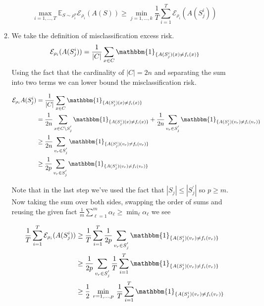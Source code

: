 \documentclass{article}
\newcommand{\one}{\mathbbm{1}}
\newcommand{\ones}[2]{\one_{\{#1\ne#2\}}}
\newcommand{\prob}[2]{\rho_#1^#2}
\newcommand{\expectation}{\mathbb{E}_{S\sim\prob{i}{n}}}
\begin{document}
\begin{enumerate}
\begin{enumerate}[label=\alph*.]
    \begin{equation}
        \max_{i=1,\dots,T} \expectation\mathcal{E}_{\rho_i}(A(S)) \ge \min_{j=1,\dots,k}\frac{1}{T}\sum\limits_{i=1}^{T}\mathcal{E}_{\rho_i}(A(S_j^i))
        \label{eqn:b}
    \end{equation}
    \item We take the definition of misclassification excess risk.
    \begin{equation*}
        \mathcal{E}_{\rho_i}(A(S_j^i)) = \frac{1}{|C|}\sum\limits_{x\in C}\ones{A(S_j^i)(x)}{f_i(x)}
    \end{equation*}
    Using the fact that the cardinality of $|C| = 2n$ and separating the sum into two terms we can lower bound the misclassification risk.

    \begin{align*}
        \mathcal{E}_{\rho_i}A(S_j^i) &= \frac{1}{|C|}\sum\limits_{x\in C}\ones{A(S_j^i)(x)}{f_i(x)}\\
        &=\frac{1}{2n} \sum\limits_{x\in C\setminus{S_{j}^{'}}}\ones{A(S_j^i)(x)}{f_i(x)} + \frac{1}{2n}\sum\limits_{v_r\in S_j^{'}}\ones{A(S_j^i)(v_r)}{f_i(v_r)}\\
        &\ge\frac{1}{2n}\sum\limits_{v_r\in S_j^{'}}\ones{A(S_j^i)(v_r)}{f_i(v_r)}\\
        &\ge\frac{1}{2p}\sum\limits_{v_r\in S_j^{'}}\ones{A(S_j^i)(v_r)}{f_i(v_r)}
    \end{align*}

    Note that in the last step we've used the fact that $|S_j|\le|S_j^'|$ so $p\ge m$. Now taking the sum over both sides, swapping the order of sums and reusing the given fact $\frac{1}{m} \sum_{\ell=1}^m\alpha_{\ell} \geq \min _{\ell} \alpha_{\ell}$ we see

    \begin{align}
        \frac{1}{T}\sum\limits_{i=1}^{T}\mathcal{E}_{\rho_i}(A(S_j^i)) &\ge \frac{1}{T}\sum\limits_{i=1}^{T}\frac{1}{2p}\sum\limits_{v_r\in S_j^{'}}\ones{A(S_j^i)(v_r)}{f_i(v_r)}{} \nonumber\\
                    &\ge \frac{1}{2p}\sum\limits_{v_r\in S_j^{'}}\frac{1}{T}\sum\limits_{i=1}^{T}\ones{A(S_j^i)(v_r)}{f_i(v_r)}{} \nonumber \\
                    &\ge \frac{1}{2}\:\min\limits_{r=1,\dots, p}\:\frac{1}{T}\sum\limits_{i=1}^{T}\ones{A(S_j^i)(v_r)}{f_i(v_r)}{}
        \label{eqn:c}
    \end{align}


\end{enumerate}
\end{enumerate}
\end{document}
